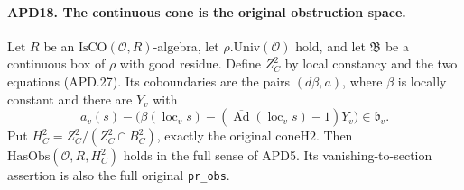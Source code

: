\paragraph{APD18. The continuous cone is the original obstruction space.}
\label{claim:APD18}
Let \(R\) be an \(\mathrm{IsCO}(\mathcal O,R)\)-algebra,
let \(\rho.\mathrm{Univ}(\mathcal O)\) hold, and let
\(\mathfrak B\) be a continuous box of \(\rho\) with good
residue.  Define \(Z_C^2\) by local constancy and the two
equations (APD.27).  Its coboundaries are the pairs
\((d\beta,a)\), where \(\beta\) is locally constant and
there are \(Y_v\) with
\[
 a_v(s)-\bigl(\beta(\operatorname{loc}_v s)
       -(\overline{\operatorname{Ad}}(\operatorname{loc}_v s)-1)Y_v\bigr)
                                                    \in\mathfrak b_v.
                                                               \tag{APD.37}
\]
Put \(H_C^2=Z_C^2/(Z_C^2\cap B_C^2)\), exactly the original
\(\mathrm{coneH2}\).  Then
\(\mathrm{HasObs}(\mathcal O,R,H_C^2)\) holds in the full
sense of APD5.  Its vanishing-to-section assertion is also the
full original \texttt{pr\_obs}.


